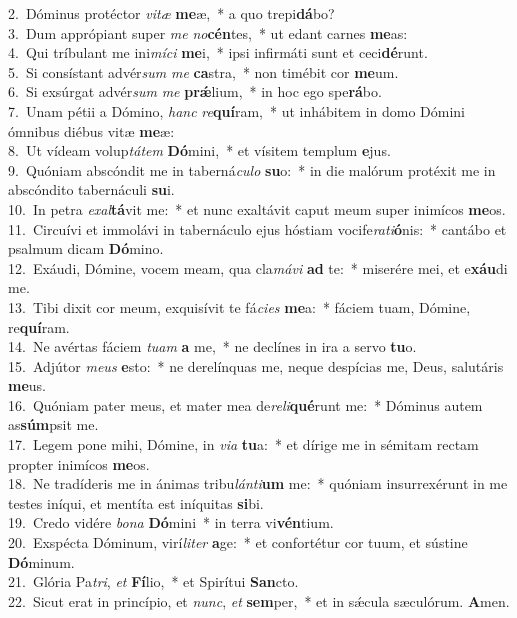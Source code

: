 {2.~}Dóminus protéctor \textit{vi}\textit{tæ} \textbf{me}æ,~* a quo trepi\textbf{dá}bo?\\
{3.~}Dum apprópiant super \textit{me} \textit{no}\textbf{cén}tes,~* ut edant carnes \textbf{me}as:\\
{4.~}Qui tríbulant me ini\textit{mí}\textit{ci} \textbf{me}i,~* ipsi infirmáti sunt et ceci\textbf{dé}runt.\\
{5.~}Si consístant advér\textit{sum} \textit{me} \textbf{ca}stra,~* non timébit cor \textbf{me}um.\\
{6.~}Si exsúrgat advér\textit{sum} \textit{me} \textbf{prǽ}lium,~* in hoc ego spe\textbf{rá}bo.\\
{7.~}Unam pétii a Dómino, \textit{hanc} \textit{re}\textbf{quí}ram,~* ut inhábitem in domo Dómini ómnibus diébus vitæ \textbf{me}æ:\\
{8.~}Ut vídeam volup\textit{tá}\textit{tem} \textbf{Dó}mini,~* et vísitem templum \textbf{e}jus.\\
{9.~}Quóniam abscóndit me in taberná\textit{cu}\textit{lo} \textbf{su}o:~* in die malórum protéxit me in abscóndito tabernáculi \textbf{su}i.\\
{10.~}In petra \textit{e}\textit{xal}\textbf{tá}vit me:~* et nunc exaltávit caput meum super inimícos \textbf{me}os.\\
{11.~}Circuívi et immolávi in tabernáculo ejus hóstiam vocife\textit{ra}\textit{ti}\textbf{ó}nis:~* cantábo et psalmum dicam \textbf{Dó}mino.\\
{12.~}Exáudi, Dómine, vocem meam, qua cla\textit{má}\textit{vi} \textbf{ad} te:~* miserére mei, et e\textbf{xáu}di me.\\
{13.~}Tibi dixit cor meum, exquisívit te fá\textit{ci}\textit{es} \textbf{me}a:~* fáciem tuam, Dómine, re\textbf{quí}ram.\\
{14.~}Ne avértas fáciem \textit{tu}\textit{am} \textbf{a} me,~* ne declínes in ira a servo \textbf{tu}o.\\
{15.~}Adjútor \textit{me}\textit{us} \textbf{e}sto:~* ne derelínquas me, neque despícias me, Deus, salutáris \textbf{me}us.\\
{16.~}Quóniam pater meus, et mater mea de\textit{re}\textit{li}\textbf{qué}runt me:~* Dóminus autem as\textbf{súm}psit me.\\
{17.~}Legem pone mihi, Dómine, in \textit{vi}\textit{a} \textbf{tu}a:~* et dírige me in sémitam rectam propter inimícos \textbf{me}os.\\
{18.~}Ne tradíderis me in ánimas tribu\textit{lán}\textit{ti}\textbf{um} me:~* quóniam insurrexérunt in me testes iníqui, et mentíta est iníquitas \textbf{si}bi.\\
{19.~}Credo vidére \textit{bo}\textit{na} \textbf{Dó}mini~* in terra vi\textbf{vén}tium.\\
{20.~}Exspécta Dóminum, virí\textit{li}\textit{ter} \textbf{a}ge:~* et confortétur cor tuum, et sústine \textbf{Dó}minum.\\
{21.~}Glória Pa\textit{tri}, \textit{et} \textbf{Fí}lio,~* et Spirítui \textbf{San}cto.\\
{22.~}Sicut erat in princípio, et \textit{nunc}, \textit{et} \textbf{sem}per,~* et in sǽcula sæculórum. \textbf{A}men.\\
